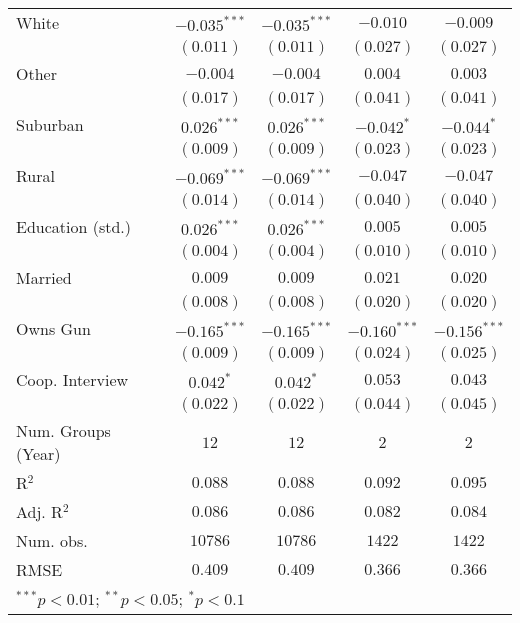 \begin{table}
\begin{center}
\begin{tabular}{l c c c c}
White                   & $-0.035^{***}$ & $-0.035^{***}$ & $-0.010$       & $-0.009$       \\
                        & $(0.011)$      & $(0.011)$      & $(0.027)$      & $(0.027)$      \\
Other                   & $-0.004$       & $-0.004$       & $0.004$        & $0.003$        \\
                        & $(0.017)$      & $(0.017)$      & $(0.041)$      & $(0.041)$      \\
Suburban                & $0.026^{***}$  & $0.026^{***}$  & $-0.042^{*}$   & $-0.044^{*}$   \\
                        & $(0.009)$      & $(0.009)$      & $(0.023)$      & $(0.023)$      \\
Rural                   & $-0.069^{***}$ & $-0.069^{***}$ & $-0.047$       & $-0.047$       \\
                        & $(0.014)$      & $(0.014)$      & $(0.040)$      & $(0.040)$      \\
Education (std.)        & $0.026^{***}$  & $0.026^{***}$  & $0.005$        & $0.005$        \\
                        & $(0.004)$      & $(0.004)$      & $(0.010)$      & $(0.010)$      \\
Married                 & $0.009$        & $0.009$        & $0.021$        & $0.020$        \\
                        & $(0.008)$      & $(0.008)$      & $(0.020)$      & $(0.020)$      \\
Owns Gun                & $-0.165^{***}$ & $-0.165^{***}$ & $-0.160^{***}$ & $-0.156^{***}$ \\
                        & $(0.009)$      & $(0.009)$      & $(0.024)$      & $(0.025)$      \\
Coop. Interview         & $0.042^{*}$    & $0.042^{*}$    & $0.053$        & $0.043$        \\
                        & $(0.022)$      & $(0.022)$      & $(0.044)$      & $(0.045)$      \\
\midrule
Num. Groups (Year)      & $12$           & $12$           & $2$            & $2$            \\
R$^2$                   & $0.088$        & $0.088$        & $0.092$        & $0.095$        \\
Adj. R$^2$              & $0.086$        & $0.086$        & $0.082$        & $0.084$        \\
Num. obs.               & $10786$        & $10786$        & $1422$         & $1422$         \\
RMSE                    & $0.409$        & $0.409$        & $0.366$        & $0.366$        \\
\bottomrule
\multicolumn{5}{l}{\scriptsize{$^{***}p<0.01$; $^{**}p<0.05$; $^{*}p<0.1$}}
\end{tabular}
\label{table_school_treat_20+_obs}
\end{center}
\end{table}
